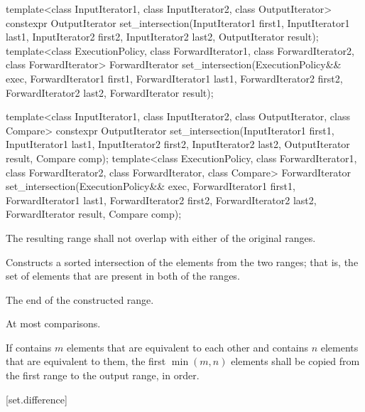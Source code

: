 %
\begin{itemdecl}
template<class InputIterator1, class InputIterator2,
         class OutputIterator>
  constexpr OutputIterator
    set_intersection(InputIterator1 first1, InputIterator1 last1,
                     InputIterator2 first2, InputIterator2 last2,
                     OutputIterator result);
template<class ExecutionPolicy, class ForwardIterator1, class ForwardIterator2,
         class ForwardIterator>
  ForwardIterator
    set_intersection(ExecutionPolicy&& exec,
                     ForwardIterator1 first1, ForwardIterator1 last1,
                     ForwardIterator2 first2, ForwardIterator2 last2,
                     ForwardIterator result);

template<class InputIterator1, class InputIterator2,
         class OutputIterator, class Compare>
  constexpr OutputIterator
    set_intersection(InputIterator1 first1, InputIterator1 last1,
                     InputIterator2 first2, InputIterator2 last2,
                     OutputIterator result, Compare comp);
template<class ExecutionPolicy, class ForwardIterator1, class ForwardIterator2,
         class ForwardIterator, class Compare>
  ForwardIterator
    set_intersection(ExecutionPolicy&& exec,
                     ForwardIterator1 first1, ForwardIterator1 last1,
                     ForwardIterator2 first2, ForwardIterator2 last2,
                     ForwardIterator result, Compare comp);
\end{itemdecl}

\begin{itemdescr}
\pnum
\requires
The resulting range shall not overlap with either of the original ranges.

\pnum
\effects
Constructs a sorted intersection of the elements from the two ranges;
that is, the set of elements that are present in both of the ranges.

\pnum
\returns
The end of the constructed range.

\pnum
\complexity
At most
comparisons.

\pnum
\remarks If  contains $m$ elements that are equivalent to
each other and  contains $n$ elements that are equivalent
to them, the first $\min(m, n)$ elements shall be copied from the first range
to the output range, in order.
\end{itemdescr}

[set.difference]{}

